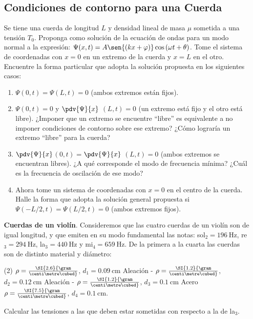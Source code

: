 \subsection*{Condiciones de contorno para una Cuerda}

\item Se tiene una cuerda de longitud $L$ y densidad lineal de masa $\mu$ sometida a una tensión $T_{0}$.
Proponga como solución de la ecuación de ondas para un modo normal a la expresión: $\Psi(x,t)= A \sen{ \left(k x+ \varphi \right ) } \cos{ \left( \omega t + \theta \right) }$.
Tome el sistema de coordenadas con $x=0$ en un extremo de la cuerda y $x=L$ en el otro.
Encuentre la forma particular que adopta la solución propuesta en los siguientes casos: 
\begin{enumerate}
	\item $\Psi(0,t) = \Psi(L,t) = 0$ (ambos extremos están fijos). 
	\item $\Psi(0,t) = 0$ y $\pdv{\Psi}{x}$ $(L,t)= 0$ (un extremo está fijo y el otro está libre).
	¿Imponer que un extremo se encuentre ``libre'' es equivalente a no imponer condiciones de contorno sobre ese extremo?
	¿Cómo lograría un extremo ``libre'' para la cuerda? 
	\item $\pdv{\Psi}{x}$$(0,t)=$$ \pdv{\Psi}{x}$ $(L,t)= 0$ (ambos extremos se encuentran libres).
	¿A qué corresponde el modo de frecuencia mínima?
	¿Cuál es la frecuencia de oscilación de ese modo? 
	\item Ahora tome un sistema de coordenadas con $x=0$ en el centro de la cuerda.
	Halle la forma que adopta la solución general propuesta si $\Psi(-L/2,t)= \Psi(L/2,t)= 0$ (ambos extremos fijos).
\end{enumerate}



\item \textbf{Cuerdas de un violín}.
Consideremos que las cuatro cuerdas de un violín son de igual longitud, y que emiten en su modo fundamental las notas: sol$_\text{2}= \SI{196}{\hertz}$, re$_\text{3}= \SI{294}{\hertz}$, la$_\text{3}= \SI{440}{\hertz}$ y mi$_\text{4}= \SI{659}{\hertz}$.
De la primera a la cuarta las cuerdas son de distinto material y diámetro:
\begin{tasks}[style=enumerate](2)
	\task {} \(\rho= \SI{2.6}{\gram\over\centi\metre\cubed}\), \(d_1= \SI{0,09}{\centi\metre}\)
	\task Aleación - $\rho = \SI{1.2}{\gram\over\centi\metre\cubed}$, $d_2 = \SI{0.12}{\centi\metre}$
	\task Aleación - $\rho = \SI{1.2}{\gram\over\centi\metre\cubed}$, $d_3 = \SI{0.1}{\centi\metre}$
	\task Acero $\rho = \SI{7.5}{\gram\over\centi\metre\cubed}$, $d_4 = \SI{0.1}{\centi\metre}$.
\end{tasks}
Calcular las tensiones a las que deben estar sometidas con respecto a la de la$_\text{3}$.



